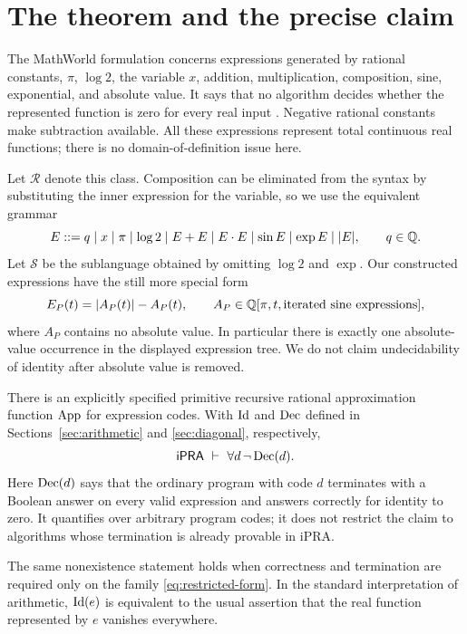 \section{The theorem and the precise claim}
\label{sec:statement}

The MathWorld formulation concerns expressions generated by rational constants,
$\pi$, $\log 2$, the variable $x$, addition, multiplication, composition, sine,
exponential, and absolute value. It says that no algorithm decides whether the
represented function is zero for every real input \cite{mathworld}. Negative
rational constants make subtraction available. All these expressions represent
total continuous real functions; there is no domain-of-definition issue here.

Let $\mathcal R$ denote this class. Composition can be eliminated from the
syntax by substituting the inner expression for the variable, so we use the
equivalent grammar
\[
 E ::= q\mid x\mid\pi\mid\log 2\mid E+E\mid E\cdot E
       \mid\sin E\mid\exp E\mid |E|,
 \qquad q\in\mathbb Q.
\]
Let $\mathcal S$ be the sublanguage obtained by omitting $\log 2$ and $\exp$.
Our constructed expressions have the still more special form
\begin{equation}\label{eq:restricted-form}
 E_P(t)=|A_P(t)|-A_P(t),
 \qquad
 A_P\in\mathbb Q[\pi,t,\text{iterated sine expressions}],
\end{equation}
where $A_P$ contains no absolute value. In particular there is exactly one
absolute-value occurrence in the displayed expression tree. We do not claim
undecidability of identity after absolute value is removed.

\begin{theorem}\label{thm:main}
There is an explicitly specified primitive recursive rational approximation
function $\operatorname{App}$ for expression codes. With $\operatorname{Id}$ and $\operatorname{Dec}$ defined in
Sections~\ref{sec:arithmetic} and \ref{sec:diagonal}, respectively,
\[
 \mathsf{iPRA}\ \vdash\ \forall d\,\neg\operatorname{Dec}(d).
\]
Here $\operatorname{Dec}(d)$ says that the ordinary program with code $d$ terminates with a
Boolean answer on every valid expression and answers correctly for identity
to zero. It quantifies over arbitrary program codes; it does not restrict the
claim to algorithms whose termination is already provable in iPRA.

The same nonexistence statement holds when correctness and termination are
required only on the family \eqref{eq:restricted-form}. In the standard
interpretation of arithmetic, $\operatorname{Id}(e)$ is equivalent to the usual assertion
that the real function represented by $e$ vanishes everywhere.
\end{theorem}

